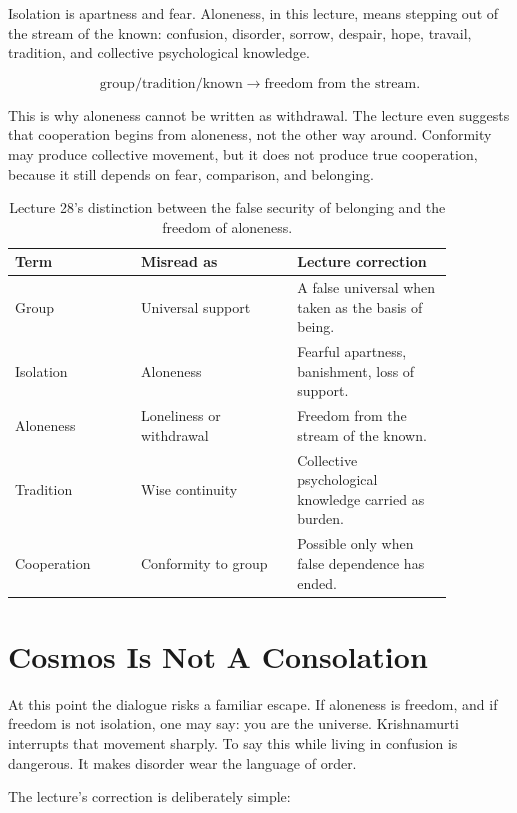 \documentclass[11pt,oneside]{book}
\begin{document}
Isolation is apartness and fear. Aloneness, in this lecture, means stepping out of the stream of the known: confusion, disorder, sorrow, despair, hope, travail, tradition, and collective psychological knowledge.

\begin{equation}
\text{group/tradition/known}
\longrightarrow
\text{freedom from the stream}.
\end{equation}

This is why aloneness cannot be written as withdrawal. The lecture even suggests that cooperation begins from aloneness, not the other way around. Conformity may produce collective movement, but it does not produce true cooperation, because it still depends on fear, comparison, and belonging.

\begin{table}
\centering
\begin{tabular}{|p{0.25\linewidth}|p{0.31\linewidth}|p{0.31\linewidth}|}
\hline
\textbf{Term} & \textbf{Misread as} & \textbf{Lecture correction} \\
\hline
Group & Universal support & A false universal when taken as the basis of being. \\
\hline
Isolation & Aloneness & Fearful apartness, banishment, loss of support. \\
\hline
Aloneness & Loneliness or withdrawal & Freedom from the stream of the known. \\
\hline
Tradition & Wise continuity & Collective psychological knowledge carried as burden. \\
\hline
Cooperation & Conformity to group & Possible only when false dependence has ended. \\
\hline
\end{tabular}
\caption{Lecture 28's distinction between the false security of belonging and the freedom of aloneness.}
\end{table}

\section{Cosmos Is Not A Consolation}

At this point the dialogue risks a familiar escape. If aloneness is freedom, and if freedom is not isolation, one may say: you are the universe. Krishnamurti interrupts that movement sharply. To say this while living in confusion is dangerous. It makes disorder wear the language of order.

The lecture's correction is deliberately simple:
\end{document}
